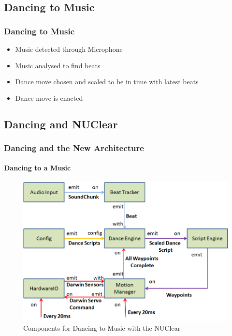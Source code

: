 \documentclass{beamer}
\begin{document}
	\subsection{Dancing to Music} %
	\begin{frame}
		\frametitle{Dancing to Music}
		\begin{itemize}
			\item Music detected through Microphone
			\item Music analysed to find beats
			\item Dance move chosen and scaled to be in time with latest beats
			\item Dance move is enacted
		\end{itemize}
	\end{frame}	
	\subsection{Dancing and NUClear} %
	\begin{frame}
		\frametitle{Dancing and the New Architecture}
		\framesubtitle{Dancing to a Music}
		\begin{figure}
			\centering
			\includegraphics[scale=.45]{Presentation_Images/dance_audio_new_arc.png}
			\caption{Components for Dancing to Music with the NUClear}
		\end{figure}
	\end{frame}	
\end{document}
